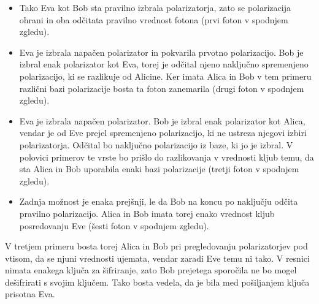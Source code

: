 \documentclass[A4paper, 11pt]{article}
\begin{document}
\begin{itemize}

\item Tako Eva kot Bob sta pravilno izbrala polarizatorja, zato se polarizacija ohrani in oba odčitata pravilno vrednost fotona (prvi foton v spodnjem zgledu).

\item Eva je izbrala napačen polarizator in pokvarila prvotno polarizacijo. Bob je izbral enak polarizator kot Eva, torej je odčital njeno naključno spremenjeno polarizacijo, ki se razlikuje od Alicine. Ker imata Alica in Bob v tem primeru različni bazi polarizacije bosta ta foton zanemarila (drugi foton v spodnjem zgledu).

\item Eva je izbrala napačen polarizator. Bob je izbral enak polarizator kot Alica, vendar je od Eve prejel spremenjeno polarizacijo, ki ne ustreza njegovi izbiri polarizatorja. Odčital bo naključno polarizacijo iz baze, ki jo je izbral. V polovici primerov te vrste bo prišlo do razlikovanja v vrednosti kljub temu, da sta Alica in Bob uporabila enaki bazi polarizacije (tretji foton v spodnjem zgledu).

\item Zadnja možnost je enaka prejšnji, le da Bob na koncu po naključju odčita pravilno polarizacijo. Alica in Bob imata torej enako vrednost kljub posredovanju Eve (šesti foton v spodnjem zgledu).

\end{itemize}

V tretjem primeru bosta torej Alica in Bob pri pregledovanju polarizatorjev pod vtisom, da se njuni vrednosti ujemata, vendar zaradi Eve temu ni tako. V resnici nimata enakega ključa za šifriranje, zato Bob prejetega sporočila ne bo mogel dešifrirati s svojim ključem. Tako bosta vedela, da je bila med pošiljanjem ključa prisotna Eva.

\pagebreak
\end{document}
